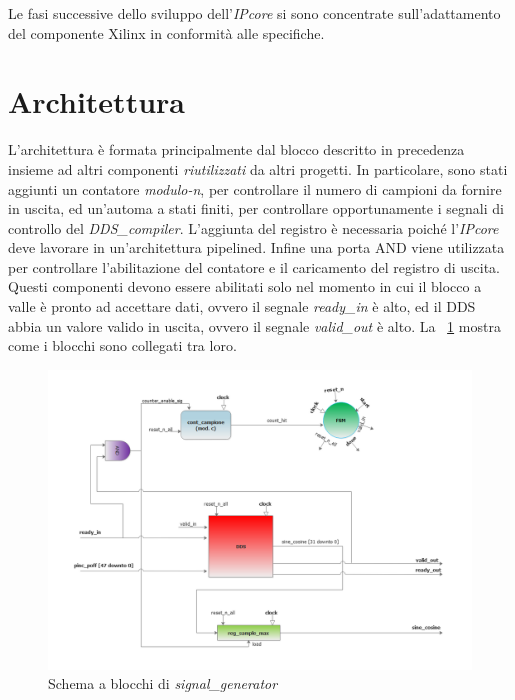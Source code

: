 \documentclass[12pt,a4paper,twoside,openany]{book}
\begin{document}
Le fasi successive dello sviluppo dell'\textit{IPcore} si sono concentrate sull'adattamento del componente Xilinx in conformità alle specifiche.
\section{Architettura}
L'architettura è formata principalmente dal blocco descritto in precedenza insieme ad altri componenti \textit{riutilizzati} da altri progetti. In particolare, sono stati aggiunti un contatore \textit{modulo-n}, per controllare il numero di campioni da fornire in uscita, ed un'automa a stati finiti, per controllare opportunamente i segnali di controllo del \textit{DDS\_compiler}. L'aggiunta del registro è necessaria poiché l'\textit{IPcore} deve lavorare in un'architettura pipelined. Infine una porta AND viene utilizzata per controllare l'abilitazione del contatore e il caricamento del registro di uscita.  Questi componenti devono essere abilitati solo nel momento in cui il blocco a valle è pronto ad accettare dati, ovvero il segnale \textit{ready\_in} è alto, ed il DDS abbia un valore valido in uscita, ovvero il segnale \textit{valid\_out} è alto. La \figurename~\ref{ipcore1_schemablocchi} mostra come i blocchi sono collegati tra loro.

\begin{figure}
\begin{center}
\includegraphics[scale=0.5, keepaspectratio]{immagini/ipcore1_schemablocchi}
\caption{Schema a blocchi di \textit{signal\_generator}}
\label{ipcore1_schemablocchi}
\end{center}
\end{figure}
\end{document}
